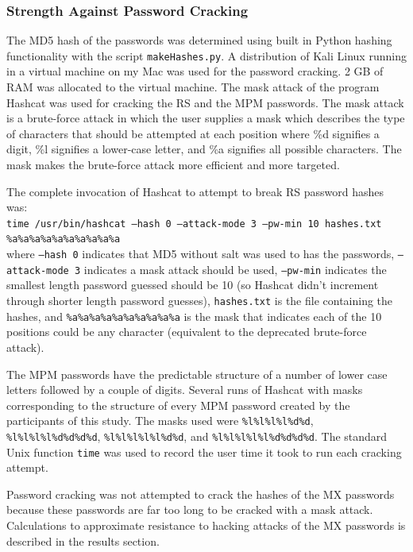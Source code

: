 \documentclass{article}
\begin{document}
\subsubsection*{Strength Against Password Cracking}
The MD5 hash of the passwords was determined using built in Python hashing functionality with the script \texttt{makeHashes.py}. A distribution of Kali Linux running in a virtual machine on my Mac was used for the password cracking. 2 GB of RAM was allocated to the virtual machine. The mask attack of the program Hashcat was used for cracking the RS and the MPM passwords. The mask attack is a brute-force attack in which the user supplies a mask which describes the type of characters that should be attempted at each position where \%d signifies a digit, \%l signifies a lower-case letter, and \%a signifies all possible characters. The mask makes the brute-force attack more efficient and more targeted.

The complete invocation of Hashcat to attempt to break RS password hashes was: \\

\texttt{time /usr/bin/hashcat --hash 0 --attack-mode 3 --pw-min 10 hashes.txt \%a\%a\%a\%a\%a\%a\%a\%a\%a\%a} \\

where \texttt{--hash 0} indicates that MD5 without salt was used to has the passwords, \texttt{--attack-mode 3} indicates a mask attack should be used, \texttt{--pw-min} indicates the smallest length password guessed should be 10 (so Hashcat didn't increment through shorter length password guesses), \texttt{hashes.txt} is the file containing the hashes, and \texttt{\%a\%a\%a\%a\%a\%a\%a\%a\%a\%a} is the mask that indicates each of the 10 positions could be any character (equivalent to the deprecated brute-force attack). 

The MPM passwords have the predictable structure of a number of lower case letters followed by a couple of digits. Several runs of Hashcat with masks corresponding to the structure of every MPM password created by the participants of this study. The masks used were \texttt{\%l\%l\%l\%l\%d\%d}, \texttt{\%l\%l\%l\%l\%d\%d\%d\%d}, \texttt{\%l\%l\%l\%l\%l\%d\%d}, and \texttt{\%l\%l\%l\%l\%l\%d\%d\%d\%d}. The standard Unix function \texttt{time} was used to record the user time it took to run each cracking attempt.

Password cracking was not attempted to crack the hashes of the MX passwords because these passwords are far too long to be cracked with a mask attack. Calculations to approximate resistance to hacking attacks of the MX passwords is described in the results section.
\end{document}
